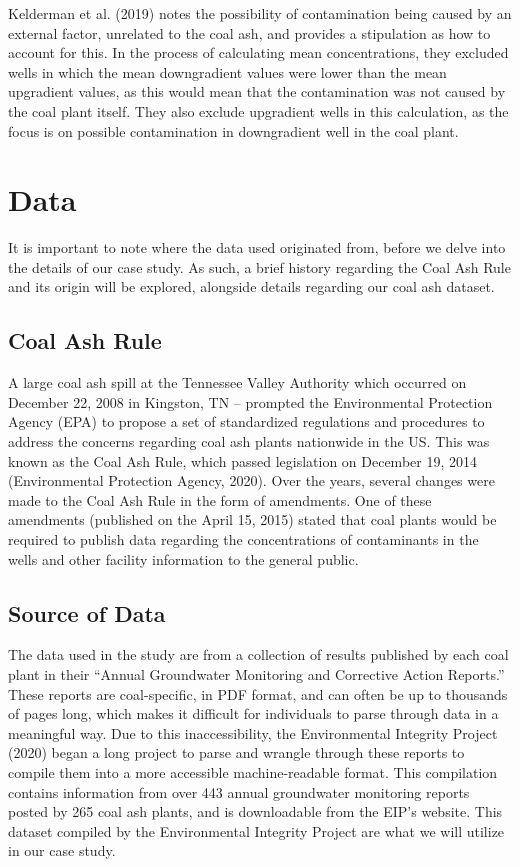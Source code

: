 \documentclass[12pt, twoside]{amherstthesis}
\begin{document}
Kelderman et al. (2019) notes the possibility of contamination being caused by an external factor, unrelated to the coal ash, and provides a stipulation as how to account for this. In the process of calculating mean concentrations, they excluded wells in which the mean downgradient values were lower than the mean upgradient values, as this would mean that the contamination was not caused by the coal plant itself. They also exclude upgradient wells in this calculation, as the focus is on possible contamination in downgradient well in the coal plant.

\hypertarget{data}{%
\section{Data}\label{data}}

It is important to note where the data used originated from, before we delve into the details of our case study. As such, a brief history regarding the Coal Ash Rule and its origin will be explored, alongside details regarding our coal ash dataset.

\hypertarget{coalashrule}{%
\subsection{Coal Ash Rule}\label{coalashrule}}

A large coal ash spill at the Tennessee Valley Authority which occurred on December 22, 2008 in Kingston, TN -- prompted the Environmental Protection Agency (EPA) to propose a set of standardized regulations and procedures to address the concerns regarding coal ash plants nationwide in the US. This was known as the Coal Ash Rule, which passed legislation on December 19, 2014 (Environmental Protection Agency, 2020). Over the years, several changes were made to the Coal Ash Rule in the form of amendments. One of these amendments (published on the April 15, 2015) stated that coal plants would be required to publish data regarding the concentrations of contaminants in the wells and other facility information to the general public.

\hypertarget{source-of-data}{%
\subsection{Source of Data}\label{source-of-data}}

The data used in the study are from a collection of results published by each coal plant in their ``Annual Groundwater Monitoring and Corrective Action Reports.'' These reports are coal-specific, in PDF format, and can often be up to thousands of pages long, which makes it difficult for individuals to parse through data in a meaningful way. Due to this inaccessibility, the Environmental Integrity Project (2020) began a long project to parse and wrangle through these reports to compile them into a more accessible machine-readable format. This compilation contains information from over 443 annual groundwater monitoring reports posted by 265 coal ash plants, and is downloadable from the EIP's website. This dataset compiled by the Environmental Integrity Project are what we will utilize in our case study.
\end{document}
